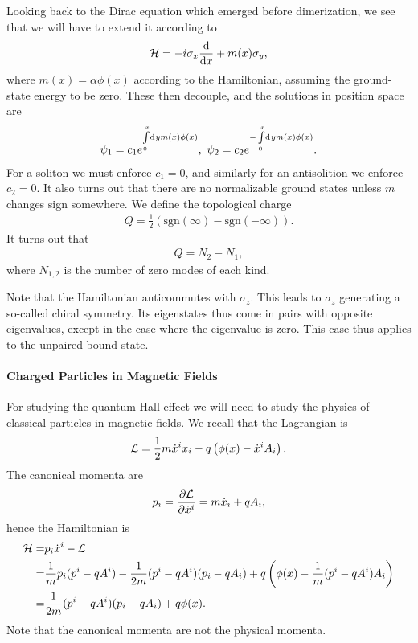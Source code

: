 Looking back to the Dirac equation which emerged before dimerization, we see that we will have to extend it according to
\begin{align*}
	\mathcal{H} = -i\sigma_{x}\dv{x} + m(x)\sigma_{y},
\end{align*}
where $m(x) = \alpha\phi(x)$ according to the Hamiltonian, assuming the ground-state energy to be zero. These then decouple, and the solutions in position space are
\begin{align*}
	\psi_{1} = c_{1}e^{\int\limits_{0}^{x}\dd[]{y}m(x)\phi(x)},\ \psi_{2} = c_{2}e^{-\int\limits_{0}^{x}\dd[]{y}m(x)\phi(x)}.
\end{align*}
For a soliton we must enforce $c_{1} = 0$, and similarly for an antisolition we enforce $c_{2} = 0$. It also turns out that there are no normalizable ground states unless $m$ changes sign somewhere. We define the topological charge
\begin{align*}
	Q = \frac{1}{2}\left(\text{sgn}(\infty) - \text{sgn}(-\infty)\right).
\end{align*}
It turns out that
\begin{align*}
	Q = N_{2} - N_{1},
\end{align*}
where $N_{1, 2}$ is the number of zero modes of each kind.

Note that the Hamiltonian anticommutes with $\sigma_{z}$. This leads to $\sigma_{z}$ generating a so-called chiral symmetry. Its eigenstates thus come in pairs with opposite eigenvalues, except in the case where the eigenvalue is zero. This case thus applies to the unpaired bound state.

\paragraph{Charged Particles in Magnetic Fields}
For studying the quantum Hall effect we will need to study the physics of classical particles in magnetic fields. We recall that the Lagrangian is
\begin{align*}
	\mathcal{L} = \frac{1}{2}m\dot{x}^{i}x_{i} - q\left(\phi(x) - \dot{x}^{i}A_{i}\right).
\end{align*}
The canonical momenta are
\begin{align*}
	p_{i} = \pdv{\ensuremath{\mathcal{L}}}{\dot{x}^{i}} = m\dot{x}_{i} + qA_{i},
\end{align*}
hence the Hamiltonian is
\begin{align*}
	\mathcal{H} =& p_{i}\dot{x}^{i} - \mathcal{L} \\
	     =& \frac{1}{m}p_{i}(p^{i} - qA^{i}) - \frac{1}{2m}(p^{i} - qA^{i})(p_{i} - qA_{i}) + q\left(\phi(x) - \frac{1}{m}(p^{i} - qA^{i})A_{i}\right) \\
	     =& \frac{1}{2m}(p^{i} - qA^{i})(p_{i} - qA_{i}) + q\phi(x).
\end{align*}
Note that the canonical momenta are not the physical momenta.

